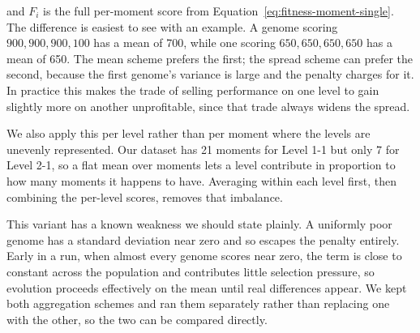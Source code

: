 \noindent
and $F_i$ is the full per-moment score from
Equation~\ref{eq:fitness-moment-single}. The difference is easiest to see with
an example. A genome scoring $900, 900, 900, 100$ has a mean of 700, while one
scoring $650, 650, 650, 650$ has a mean of 650. The mean scheme prefers the
first; the spread scheme can prefer the second, because the first genome's
variance is large and the penalty charges for it. In practice this makes the
trade of selling performance on one level to gain slightly more on another
unprofitable, since that trade always widens the spread.

\noindent
We also apply this per level rather than per moment where the levels are
unevenly represented. Our dataset has 21 moments for Level 1-1 but only 7 for
Level 2-1, so a flat mean over moments lets a level contribute in proportion to
how many moments it happens to have. Averaging within each level first, then
combining the per-level scores, removes that imbalance.

\noindent
This variant has a known weakness we should state plainly. A uniformly poor
genome has a standard deviation near zero and so escapes the penalty entirely.
Early in a run, when almost every genome scores near zero, the term is close to
constant across the population and contributes little selection pressure, so
evolution proceeds effectively on the mean until real differences appear. We
kept both aggregation schemes and ran them separately rather than replacing one
with the other, so the two can be compared directly.
